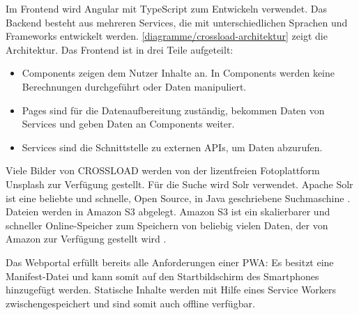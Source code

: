 Im Frontend wird Angular mit TypeScript zum Entwickeln verwendet. Das Backend besteht aus mehreren Services, die mit unterschiedlichen Sprachen und Frameworks entwickelt werden. \autoref{diagramme/crossload-architektur} zeigt die Architektur. Das Frontend ist in drei Teile aufgeteilt:
\begin{itemize}
\item Components zeigen dem Nutzer Inhalte an. In Components werden keine Berechnungen durchgeführt oder Daten manipuliert.
\item Pages sind für die Datenaufbereitung zuständig, bekommen Daten von Services und geben Daten an Components weiter.
\item Services sind die Schnittstelle zu externen \acp{API}, um Daten abzurufen.
\end{itemize}
Viele Bilder von CROSSLOAD werden von der lizentfreien Fotoplattform Unsplash zur Verfügung gestellt. Für die Suche wird Solr verwendet. Apache Solr ist eine beliebte und schnelle, Open Source, in Java geschriebene Suchmaschine \autocite{solr}. Dateien werden in Amazon S3 abgelegt. Amazon S3 ist ein skalierbarer und schneller Online-Speicher zum Speichern von beliebig vielen Daten, der von Amazon zur Verfügung gestellt wird \autocite{amazon-s3}.


Das Webportal erfüllt bereits alle Anforderungen einer \ac{PWA}: Es besitzt eine Manifest-Datei und kann somit auf den Startbildschirm des Smartphones hinzugefügt werden. Statische Inhalte werden mit Hilfe eines Service Workers zwischengespeichert und sind somit auch offline verfügbar. 


